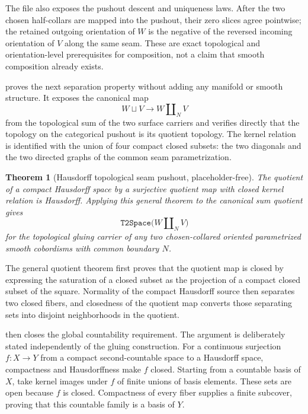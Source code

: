\documentclass[11pt]{amsart}
\theoremstyle{plain}
\newtheorem{theorem}{Theorem}[section]
\theoremstyle{definition}
\begin{document}
The file also exposes the pushout descent and uniqueness laws.  After the two
chosen half-collars are mapped into the pushout, their zero slices agree
pointwise; the retained outgoing orientation of \(W\) is the negative of the
reversed incoming orientation of \(V\) along the same seam.  These are exact
topological and orientation-level prerequisites for composition, not a claim
that smooth composition already exists.

 proves the next separation property
without adding any manifold or smooth structure.  It exposes the canonical map
\[
W\sqcup V\longrightarrow W\mathbin{\amalg_N}V
\]
from the topological sum of the two surface carriers and verifies directly
that the topology on the categorical pushout is its quotient topology.  The
kernel relation is identified with the union of four compact closed subsets:
the two diagonals and the two directed graphs of the common seam
parametrization.

\begin{theorem}[Hausdorff topological seam pushout, placeholder-free]
The quotient of a compact Hausdorff space by a surjective quotient map with
closed kernel relation is Hausdorff.  Applying this general theorem to the
canonical sum quotient gives
\[
\texttt{T2Space}\bigl(W\mathbin{\amalg_N}V\bigr)
\]
for the topological gluing carrier of any two chosen-collared oriented
parametrized smooth cobordisms with common boundary \(N\).
\end{theorem}

The general quotient theorem first proves that the quotient map is closed by
expressing the saturation of a closed subset as the projection of a compact
closed subset of the square.  Normality of the compact Hausdorff source then
separates two closed fibers, and closedness of the quotient map converts those
separating sets into disjoint neighborhoods in the quotient.

 then closes the global
countability requirement.  The argument is deliberately stated independently
of the gluing construction.  For a continuous surjection \(f:X\to Y\) from a
compact second-countable space to a Hausdorff space, compactness and
Hausdorffness make \(f\) closed.  Starting from a countable basis of \(X\), take
kernel images under \(f\) of finite unions of basis elements.  These sets are
open because \(f\) is closed.  Compactness of every fiber supplies a finite
subcover, proving that this countable family is a basis of \(Y\).
\end{document}

